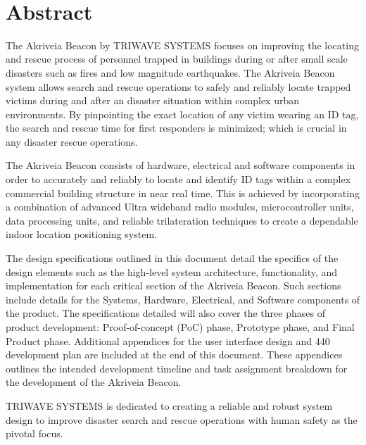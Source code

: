 
\
\section*{Abstract}	%

\bigskip
The Akriveia Beacon by TRIWAVE SYSTEMS focuses on improving the locating and rescue
process of personnel trapped in buildings during or after small scale disasters such as fires and
low magnitude earthquakes. The Akriveia Beacon system allows search and rescue operations to safely and reliably locate trapped victims during and after an disaster situation within complex urban environments. By pinpointing the exact location of any victim wearing an ID tag, the search and rescue time for first responders is minimized; which is crucial in any disaster rescue operations.

\bigskip
The Akriveia Beacon consists of hardware, electrical and software components in order to accurately and reliably to locate and identify ID tags within a complex commercial building structure in near real time. This is achieved by incorporating a combination of advanced Ultra wideband radio modules, microcontroller units, data processing units, and reliable trilateration techniques to create a dependable indoor location positioning system. 

\bigskip
The design specifications outlined in this document detail the specifics of the design elements such as the high-level system architecture, functionality, and implementation for each critical section of the Akriveia Beacon. Such sections include details for the Systems, Hardware, Electrical, and Software components of the product. The specifications detailed will also cover the three phases of product development: Proof-of-concept (PoC) phase, Prototype phase, and Final Product phase. Additional appendices for the user interface design and 440 development plan are included at the end of this document. These appendices outlines the intended development timeline and task assignment breakdown for the development of the Akriveia Beacon.

\bigskip
TRIWAVE SYSTEMS is dedicated to creating a reliable and robust system design to improve disaster search and rescue operations with human safety as the pivotal focus.
